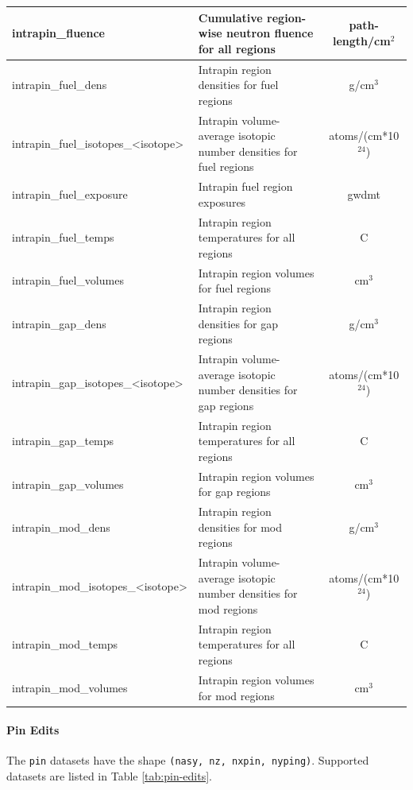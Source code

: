 \begin{longtable}[h]{|l|p{}|c|}
intrapin\_fluence & Cumulative region-wise neutron fluence for all regions & path-length/cm$^2$ \\\hline
intrapin\_fuel\_dens & Intrapin region densities for fuel regions & g/cm$^3$ \\\hline
intrapin\_fuel\_isotopes\_<isotope> & Intrapin volume-average isotopic number densities for fuel regions & atoms/(cm*10$^{24}$) \\\hline
intrapin\_fuel\_exposure & Intrapin fuel region exposures & \acrshort{gwdmt} \\\hline
intrapin\_fuel\_temps & Intrapin region temperatures for all regions & C \\\hline
intrapin\_fuel\_volumes & Intrapin region volumes for fuel regions & cm$^3$ \\\hline
intrapin\_gap\_dens & Intrapin region densities for gap regions & g/cm$^3$ \\\hline
intrapin\_gap\_isotopes\_<isotope> & Intrapin volume-average isotopic number densities for gap regions & atoms/(cm*10$^{24}$) \\\hline
intrapin\_gap\_temps & Intrapin region temperatures for all regions & C \\\hline
intrapin\_gap\_volumes & Intrapin region volumes for gap regions & cm$^3$ \\\hline
intrapin\_mod\_dens & Intrapin region densities for mod regions & g/cm$^3$ \\\hline
intrapin\_mod\_isotopes\_<isotope> & Intrapin volume-average isotopic number densities for mod regions & atoms/(cm*10$^{24}$) \\\hline
intrapin\_mod\_temps & Intrapin region temperatures for all regions & C \\\hline
intrapin\_mod\_volumes & Intrapin region volumes for mod regions & cm$^3$ \\\hline
\end{longtable}

\FloatBarrier

\paragraph{Pin Edits}\label{sec:pin-edits}

The \texttt{pin} datasets have the shape \texttt{(nasy, nz, nxpin, nyping)}.  Supported datasets are listed in Table \ref{tab:pin-edits}.

